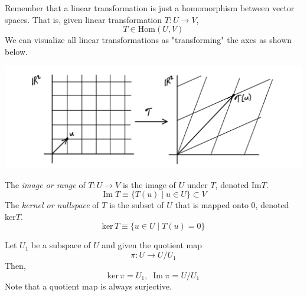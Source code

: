 \documentclass{article}
\DeclareMathOperator{\im}{Im}
\begin{document}
  Remember that a linear transformation is just a homomorphism between vector spaces. That is, given linear transformation $T: U \longrightarrow V$, 
  \begin{equation}
    T \in \text{Hom}(U,V)
  \end{equation}
  We can visualize all linear transformations as "transforming" the axes as shown below. 
  \begin{center}
    \includegraphics[scale=0.25]{img/Linear_Map.PNG}
  \end{center}

  \begin{definition}[Image]
    The \textit{image or range} of $T: U \longrightarrow V$ is the image of $U$ under $T$, denoted Im$T$. 
    \begin{equation}
      \im{T} \equiv \{ T(u) \; | \; u \in U\} \subset V
    \end{equation}
    The \textit{kernel or nullspace} of $T$ is the subset of $U$ that is mapped onto $0$, denoted ker$T$. 
    \begin{equation}
      \text{ker}\,T \equiv \{ u \in U \; | \; T(u) = 0\}
    \end{equation}
  \end{definition}

  \begin{example}
    Let $U_1$ be a subspace of $U$ and given the quotient map
    \begin{equation}
      \pi: U \longrightarrow U / U_1
    \end{equation}
    Then, 
    \begin{equation}
      \text{ker}\,\pi = U_1, \; \im{\pi} = U / U_1
    \end{equation}
    Note that a quotient map is always surjective. 
  \end{example}
\end{document}
